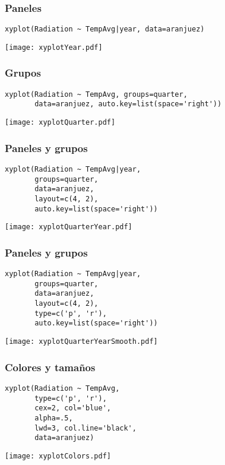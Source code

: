 \documentclass[xcolor={usenames,svgnames,dvipsnames}]{beamer}
\begin{document}
\begin{frame}[fragile]
\frametitle{Paneles}
\label{sec-2-1-6}


\lstset{language=R}
\begin{lstlisting}
xyplot(Radiation ~ TempAvg|year, data=aranjuez)
\end{lstlisting}

\texttt{[image: xyplotYear.pdf]}
\end{frame}
\begin{frame}[fragile]
\frametitle{Grupos}
\label{sec-2-1-7}


\lstset{language=R}
\begin{lstlisting}
xyplot(Radiation ~ TempAvg, groups=quarter,
       data=aranjuez, auto.key=list(space='right'))
\end{lstlisting}

\texttt{[image: xyplotQuarter.pdf]}
\end{frame}
\begin{frame}[fragile]
\frametitle{Paneles y grupos}
\label{sec-2-1-8}


\lstset{language=R}
\begin{lstlisting}
xyplot(Radiation ~ TempAvg|year,
       groups=quarter,
       data=aranjuez,
       layout=c(4, 2),
       auto.key=list(space='right'))
\end{lstlisting}

\texttt{[image: xyplotQuarterYear.pdf]}
\end{frame}
\begin{frame}[fragile]
\frametitle{Paneles y grupos}
\label{sec-2-1-9}


\lstset{language=R}
\begin{lstlisting}
xyplot(Radiation ~ TempAvg|year,
       groups=quarter,
       data=aranjuez,
       layout=c(4, 2),
       type=c('p', 'r'),
       auto.key=list(space='right'))
\end{lstlisting}

\texttt{[image: xyplotQuarterYearSmooth.pdf]}
\end{frame}
\begin{frame}[fragile]
\frametitle{Colores y tamaños}
\label{sec-2-1-10}


\lstset{language=R}
\begin{lstlisting}
xyplot(Radiation ~ TempAvg,
       type=c('p', 'r'),
       cex=2, col='blue',
       alpha=.5,
       lwd=3, col.line='black',
       data=aranjuez)
\end{lstlisting}

\texttt{[image: xyplotColors.pdf]}
\end{frame}
\end{document}
